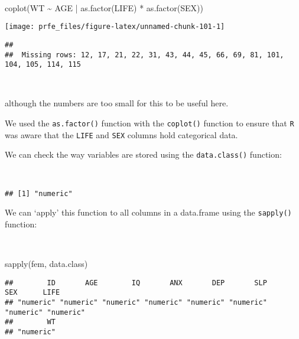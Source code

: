 \documentclass[
  12pt,
  a4paper]{book}
\newenvironment{Shaded}{\begin{snugshade}}{\end{snugshade}}
\newcommand{\FunctionTok}[1]{\textcolor[rgb]{0.00,0.00,0.00}{#1}}
\newcommand{\NormalTok}[1]{#1}
\newcommand{\SpecialCharTok}[1]{\textcolor[rgb]{0.00,0.00,0.00}{#1}}
\begin{document}
~

\begin{Shaded}
\begin{Highlighting}[]
\FunctionTok{coplot}\NormalTok{(WT }\SpecialCharTok{\textasciitilde{}}\NormalTok{ AGE }\SpecialCharTok{|} \FunctionTok{as.factor}\NormalTok{(LIFE) }\SpecialCharTok{*} \FunctionTok{as.factor}\NormalTok{(SEX))}
\end{Highlighting}
\end{Shaded}

\begin{center}\texttt{[image: prfe\_files/figure-latex/unnamed-chunk-101-1]} \end{center}

\begin{verbatim}
## 
##  Missing rows: 12, 17, 21, 22, 31, 43, 44, 45, 66, 69, 81, 101, 104, 105, 114, 115
\end{verbatim}

~

although the numbers are too small for this to be useful here.

We used the \texttt{as.factor()} function with the \texttt{coplot()} function to ensure that \texttt{R} was aware that the \texttt{LIFE}
and \texttt{SEX} columns hold categorical data.

We can check the way variables are stored using the \texttt{data.class()} function:

~

\begin{Shaded}
\end{Shaded}

\begin{verbatim}
## [1] "numeric"
\end{verbatim}

\newpage

We can `apply' this function to all columns in a data.frame using the \texttt{sapply()} function:

~

\begin{Shaded}
\begin{Highlighting}[]
\FunctionTok{sapply}\NormalTok{(fem, data.class)}
\end{Highlighting}
\end{Shaded}

\begin{verbatim}
##        ID       AGE        IQ       ANX       DEP       SLP       SEX      LIFE 
## "numeric" "numeric" "numeric" "numeric" "numeric" "numeric" "numeric" "numeric" 
##        WT 
## "numeric"
\end{verbatim}
\end{document}

